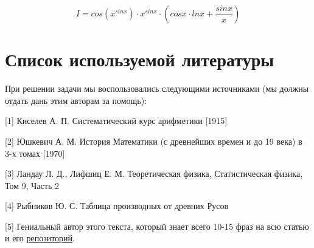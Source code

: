\documentclass[a4paper, 12pt]{article}
\begin{document}
\begin{equation}
	I = cos\left(x^{sinx}\right) \cdot x^{sinx} \cdot \left(cosx \cdot lnx + \frac{sinx}{x}\right)
\end{equation}



\section{Список используемой литературы}
При решении задачи мы воспользовались следующими источниками (мы должны отдать дань этим авторам за помощь):

[1] Киселев А. П. Систематический курс арифметики [1915]

[2] Юшкевич А. М. История Математики (с древнейших времен и до 19 века) в 3-х томах [1970]

[3] Ландау Л. Д., Лифшиц Е. М. Теоретическая физика, Статистическая физика, Том 9, Часть 2

[4] Рыбников Ю. С. Таблица производных от древних Русов

[5] Гениальный автор этого текста, который знает всего 10-15 фраз на всю статью и его \href{https://github.com/Vokerlee/Introduction-to-compiler-technologies/tree/master/8.%20Differentiator}{репозиторий}.
\end{document}
